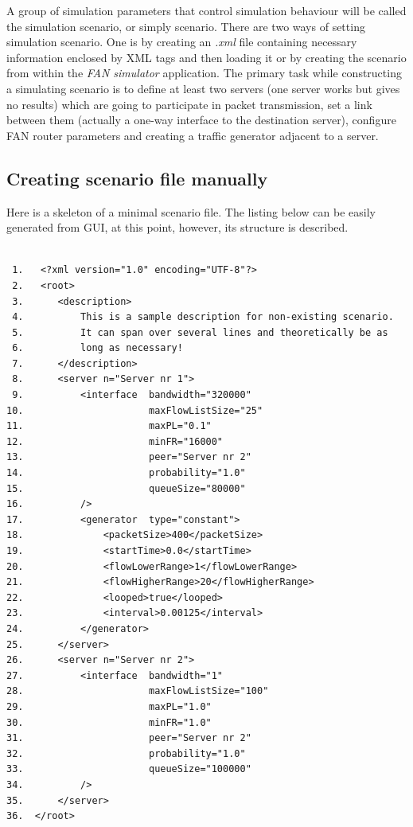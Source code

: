 \documentclass[a4paper,12pt]{article}
\begin{document}
	A group of simulation parameters that control simulation behaviour will be
	called the simulation scenario, or simply scenario. There are two ways of
	setting simulation scenario. One is by creating an \emph{.xml} file containing
	necessary information enclosed by XML tags and then loading it or by creating
	the scenario from within the \emph{FAN simulator} application. 
	The primary task while constructing a simulating scenario is to define at
	least two servers (one server works but gives no results) which are
	going to participate in packet transmission, set a link between them (actually
	a one-way interface to the destination server), configure FAN router
	parameters and creating a traffic generator adjacent to a server.
	
   \subsection{Creating scenario file manually}
	\label{MANUALCREATION}
    Here is a skeleton of a minimal scenario file. The listing below can be
    easily generated from GUI, at this point, however, its structure is
    described.
    \begin{verbatim}

 1.   <?xml version="1.0" encoding="UTF-8"?>
 2.   <root>
 3.      <description>
 4.          This is a sample description for non-existing scenario.
 5.          It can span over several lines and theoretically be as
 6.          long as necessary!
 7.      </description>
 8.      <server n="Server nr 1">
 9.          <interface	 bandwidth="320000"
10.                      maxFlowListSize="25"
11.                      maxPL="0.1"
12.                      minFR="16000"
13.                      peer="Server nr 2"
14.                      probability="1.0"
15.                      queueSize="80000"
16.          />
17.          <generator  type="constant">
18.              <packetSize>400</packetSize>
19.              <startTime>0.0</startTime>
20.              <flowLowerRange>1</flowLowerRange>
21.              <flowHigherRange>20</flowHigherRange>
22.              <looped>true</looped>
23.              <interval>0.00125</interval>
24.          </generator>
25.      </server>
26.      <server n="Server nr 2">
27.          <interface  bandwidth="1" 
28.                      maxFlowListSize="100"
29.                      maxPL="1.0"
30.                      minFR="1.0"
31.                      peer="Server nr 2"
32.                      probability="1.0"
33.                      queueSize="100000"
34.          />
35.      </server>
36.  </root> 

	\end{verbatim}
 
\end{document}
